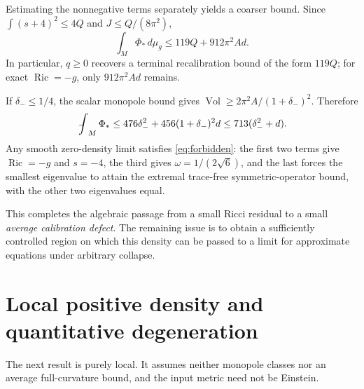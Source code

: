 \documentclass[a4paper,11pt]{article}
\numberwithin{equation}{section}
\theoremstyle{definition}
\newcommand{\Ric}{\operatorname{Ric}}
\newcommand{\Vol}{\operatorname{Vol}}
\newcommand{\dd}{\,d\mu_g}
\newcommand{\fint}{\mathop{\rlap{\,\raisebox{0.1ex}{\tiny$-$}}\int}\nolimits}
\begin{document}
Estimating the nonnegative terms separately yields a coarser bound.
Since $\int(s+4)^2\le4Q$ and $J\le Q/(8\pi^2)$,
\begin{equation}\label{eq:119}
\boxed{\int_M\Phi_*\dd\le119Q+912\pi^2 A d.}
\end{equation}
In particular, $q\ge0$ recovers a terminal recalibration bound of the form $119Q$; for exact $\Ric=-g$, only $912\pi^2Ad$ remains.

If $\delta_-\le1/4$, the scalar monopole bound gives $\Vol\ge2\pi^2A/(1+\delta_-)^2$. Therefore
\begin{equation}\label{eq:meanPhi}
\fint_M\Phi_*\le476\delta_-^2+456(1+\delta_-)^2d
\le713(\delta_-^2+d).
\end{equation}
Any smooth zero-density limit satisfies \eqref{eq:forbidden}: the first two terms give $\Ric=-g$ and $s=-4$, the third gives $\omega=1/(2\sqrt6)$, and the last forces the smallest eigenvalue to attain the extremal trace-free symmetric-operator bound, with the other two eigenvalues equal.

This completes the algebraic passage from a small Ricci residual to a small \emph{average calibration defect}. The remaining issue is to obtain a sufficiently controlled region on which this density can be passed to a limit for approximate equations under arbitrary collapse.

\section{Local positive density and quantitative degeneration}\label{sec:local-density}
The next result is purely local. It assumes neither monopole classes nor an average full-curvature bound, and the input metric need not be Einstein.
\end{document}
